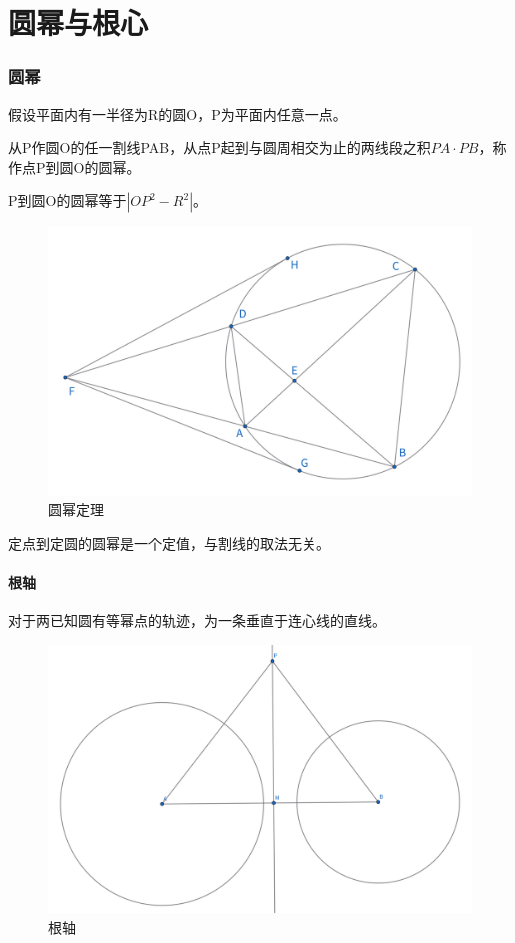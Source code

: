 \part{圆幂与根心}





\section{圆幂}
\begin{theorem}[圆幂定理]
    假设平面内有一半径为R的圆O，P为平面内任意一点。
    
    从P作圆O的任一割线PAB，从点P起到与圆周相交为止的两线段之积$PA\cdot PB$，称作点P到圆O的圆幂。
    
    P到圆O的圆幂等于$|OP^2 - R^2|$。
\end{theorem}
\begin{figure}[H]
    \centering
    \includegraphics[width=0.7\linewidth]{figures/圆幂定理.png}
    \caption{圆幂定理}
\end{figure}
\begin{remark}
    定点到定圆的圆幂是一个定值，与割线的取法无关。
\end{remark}

\newpage 
\subsection{根轴}
\begin{theorem}[根轴]
    对于两已知圆有等幂点的轨迹，为一条垂直于连心线的直线。
\end{theorem}
\begin{figure}[H]
    \centering
    \includegraphics[width=0.7\linewidth]{figures/根轴.png}
    \caption{根轴}
\end{figure}

